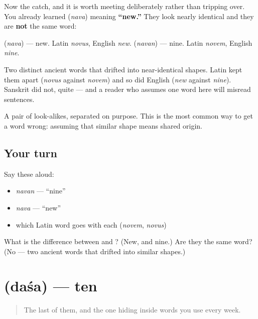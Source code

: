 Now the catch, and it is worth meeting deliberately rather than tripping over. You already learned \textbf{} (\emph{nava}) meaning \textbf{\textquotedblleft{}new.\textquotedblright{}} They look nearly identical and they are \textbf{not} the same word:

\emph{} (\emph{nava}) — new. Latin \emph{novus}, English \emph{new}. \emph{} (\emph{navan}) — nine. Latin \emph{novem}, English \emph{nine}.

Two distinct ancient words that drifted into near-identical shapes. Latin kept them apart (\emph{novus} against \emph{novem}) and so did English (\emph{new} against \emph{nine}). Sanskrit did not, quite — and a reader who assumes one word here will misread sentences.

\begin{grammarlens}[title={What you've built}]
A pair of look-alikes, separated on purpose. This is the most common way to get a word wrong: assuming that similar shape means shared origin.
\end{grammarlens}

\subsection*{Your turn}
Say these aloud:

\begin{itemize}
\raggedright
  \item \emph{navan} — \textquotedblleft{}nine\textquotedblright{}
  \item \emph{nava} — \textquotedblleft{}new\textquotedblright{}
  \item which Latin word goes with each (\emph{novem}, \emph{novus})
\end{itemize}

\begin{tcolorbox}[breakable,colback=teal!4,colframe=teal!35!black,title={Before you move on}]
What is the difference between  and ? (New, and nine.) Are they the same word? (No — two ancient words that drifted into similar shapes.)
\end{tcolorbox}
\section[\texorpdfstring{\sk{दश} (daśa)}{दश (daśa)}]{ (daśa) — ten}

\label{lesson:SA-C19-ten}



\begin{quote}
The last of them, and the one hiding inside words you use every week.
\end{quote}

